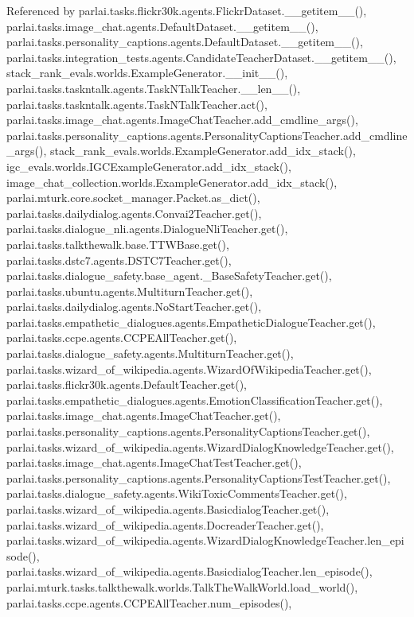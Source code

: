 Referenced by parlai.\+tasks.\+flickr30k.\+agents.\+Flickr\+Dataset.\+\_\+\+\_\+getitem\+\_\+\+\_\+(), parlai.\+tasks.\+image\+\_\+chat.\+agents.\+Default\+Dataset.\+\_\+\+\_\+getitem\+\_\+\+\_\+(), parlai.\+tasks.\+personality\+\_\+captions.\+agents.\+Default\+Dataset.\+\_\+\+\_\+getitem\+\_\+\+\_\+(), parlai.\+tasks.\+integration\+\_\+tests.\+agents.\+Candidate\+Teacher\+Dataset.\+\_\+\+\_\+getitem\+\_\+\+\_\+(), stack\+\_\+rank\+\_\+evals.\+worlds.\+Example\+Generator.\+\_\+\+\_\+init\+\_\+\+\_\+(), parlai.\+tasks.\+taskntalk.\+agents.\+Task\+N\+Talk\+Teacher.\+\_\+\+\_\+len\+\_\+\+\_\+(), parlai.\+tasks.\+taskntalk.\+agents.\+Task\+N\+Talk\+Teacher.\+act(), parlai.\+tasks.\+image\+\_\+chat.\+agents.\+Image\+Chat\+Teacher.\+add\+\_\+cmdline\+\_\+args(), parlai.\+tasks.\+personality\+\_\+captions.\+agents.\+Personality\+Captions\+Teacher.\+add\+\_\+cmdline\+\_\+args(), stack\+\_\+rank\+\_\+evals.\+worlds.\+Example\+Generator.\+add\+\_\+idx\+\_\+stack(), igc\+\_\+evals.\+worlds.\+I\+G\+C\+Example\+Generator.\+add\+\_\+idx\+\_\+stack(), image\+\_\+chat\+\_\+collection.\+worlds.\+Example\+Generator.\+add\+\_\+idx\+\_\+stack(), parlai.\+mturk.\+core.\+socket\+\_\+manager.\+Packet.\+as\+\_\+dict(), parlai.\+tasks.\+dailydialog.\+agents.\+Convai2\+Teacher.\+get(), parlai.\+tasks.\+dialogue\+\_\+nli.\+agents.\+Dialogue\+Nli\+Teacher.\+get(), parlai.\+tasks.\+talkthewalk.\+base.\+T\+T\+W\+Base.\+get(), parlai.\+tasks.\+dstc7.\+agents.\+D\+S\+T\+C7\+Teacher.\+get(), parlai.\+tasks.\+dialogue\+\_\+safety.\+base\+\_\+agent.\+\_\+\+Base\+Safety\+Teacher.\+get(), parlai.\+tasks.\+ubuntu.\+agents.\+Multiturn\+Teacher.\+get(), parlai.\+tasks.\+dailydialog.\+agents.\+No\+Start\+Teacher.\+get(), parlai.\+tasks.\+empathetic\+\_\+dialogues.\+agents.\+Empathetic\+Dialogue\+Teacher.\+get(), parlai.\+tasks.\+ccpe.\+agents.\+C\+C\+P\+E\+All\+Teacher.\+get(), parlai.\+tasks.\+dialogue\+\_\+safety.\+agents.\+Multiturn\+Teacher.\+get(), parlai.\+tasks.\+wizard\+\_\+of\+\_\+wikipedia.\+agents.\+Wizard\+Of\+Wikipedia\+Teacher.\+get(), parlai.\+tasks.\+flickr30k.\+agents.\+Default\+Teacher.\+get(), parlai.\+tasks.\+empathetic\+\_\+dialogues.\+agents.\+Emotion\+Classification\+Teacher.\+get(), parlai.\+tasks.\+image\+\_\+chat.\+agents.\+Image\+Chat\+Teacher.\+get(), parlai.\+tasks.\+personality\+\_\+captions.\+agents.\+Personality\+Captions\+Teacher.\+get(), parlai.\+tasks.\+wizard\+\_\+of\+\_\+wikipedia.\+agents.\+Wizard\+Dialog\+Knowledge\+Teacher.\+get(), parlai.\+tasks.\+image\+\_\+chat.\+agents.\+Image\+Chat\+Test\+Teacher.\+get(), parlai.\+tasks.\+personality\+\_\+captions.\+agents.\+Personality\+Captions\+Test\+Teacher.\+get(), parlai.\+tasks.\+dialogue\+\_\+safety.\+agents.\+Wiki\+Toxic\+Comments\+Teacher.\+get(), parlai.\+tasks.\+wizard\+\_\+of\+\_\+wikipedia.\+agents.\+Basicdialog\+Teacher.\+get(), parlai.\+tasks.\+wizard\+\_\+of\+\_\+wikipedia.\+agents.\+Docreader\+Teacher.\+get(), parlai.\+tasks.\+wizard\+\_\+of\+\_\+wikipedia.\+agents.\+Wizard\+Dialog\+Knowledge\+Teacher.\+len\+\_\+episode(), parlai.\+tasks.\+wizard\+\_\+of\+\_\+wikipedia.\+agents.\+Basicdialog\+Teacher.\+len\+\_\+episode(), parlai.\+mturk.\+tasks.\+talkthewalk.\+worlds.\+Talk\+The\+Walk\+World.\+load\+\_\+world(), parlai.\+tasks.\+ccpe.\+agents.\+C\+C\+P\+E\+All\+Teacher.\+num\+\_\+episodes(), 